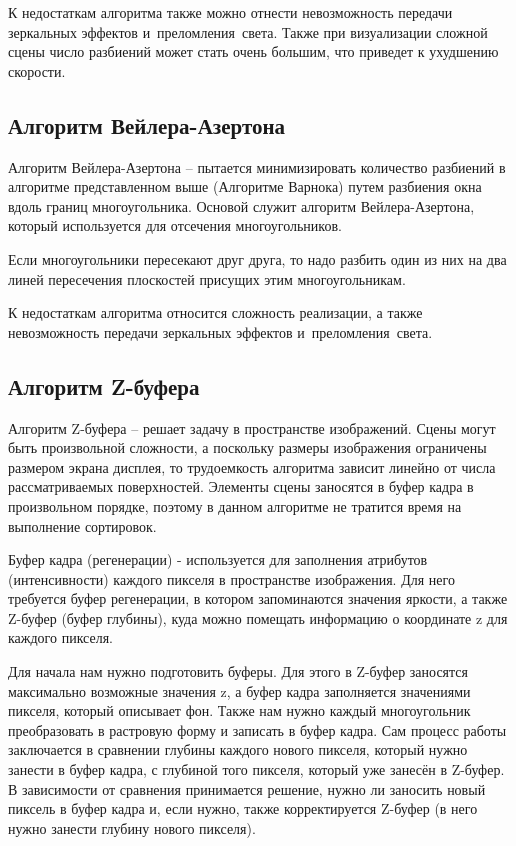 К недостаткам алгоритма также можно отнести невозможность передачи зеркальных эффектов и преломления света. Также при визуализации сложной сцены число разбиений может стать очень большим, что приведет к ухудшению скорости.

\subsection{Алгоритм Вейлера-Азертона}

Алгоритм Вейлера-Азертона -- пытается минимизировать количество разбиений в алгоритме представленном выше (Алгоритме Варнока) путем разбиения окна вдоль границ многоугольника. Основой служит алгоритм Вейлера-Азертона, который используется для отсечения многоугольников.

Если многоугольники пересекают друг друга, то надо разбить один из них на два линей пересечения плоскостей присущих этим многоугольникам.

К недостаткам алгоритма относится сложность реализации, а также невозможность передачи зеркальных эффектов и преломления света.

\subsection{Алгоритм Z-буфера}

Алгоритм Z-буфера -- решает задачу в пространстве изображений. Сцены могут быть произвольной сложности, а поскольку размеры изображения ограничены размером экрана дисплея, то трудоемкость алгоритма зависит линейно от числа рассматриваемых поверхностей. Элементы сцены заносятся в буфер кадра в произвольном порядке, поэтому в данном алгоритме не тратится время на выполнение сортировок.

Буфер кадра (регенерации) - используется для заполнения атрибутов (интенсивности) каждого пикселя в пространстве изображения. Для него требуется буфер регенерации, в котором запоминаются значения яркости, а также Z-буфер (буфер глубины), куда можно помещать информацию о координате z для каждого пикселя.

Для начала нам нужно подготовить буферы. Для этого в Z-буфер заносятся максимально возможные значения z, а буфер кадра заполняется значениями пикселя, который описывает фон. Также нам нужно каждый многоугольник преобразовать в растровую форму и записать в буфер кадра. Сам процесс работы заключается в сравнении глубины каждого нового пикселя, который нужно занести в буфер кадра, с глубиной того пикселя, который уже занесён в Z-буфер. В зависимости от сравнения принимается решение, нужно ли заносить новый пиксель в буфер кадра и, если нужно, также корректируется Z-буфер (в него нужно занести глубину нового пикселя).

